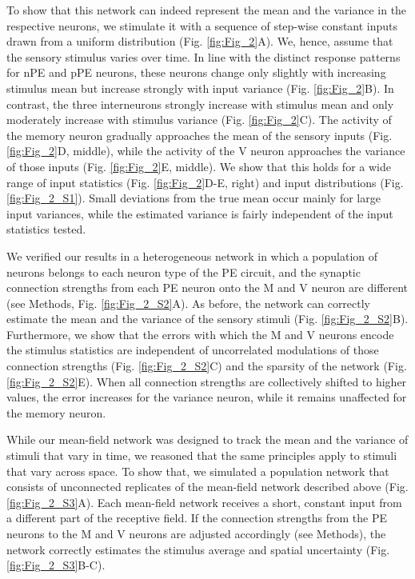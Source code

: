 \documentclass[10pt,a4paper]{article}
\begin{document}
To show that this network can indeed represent the mean and the variance in the respective neurons, we stimulate it with a sequence of step-wise constant inputs drawn from a uniform distribution (Fig. \ref{fig:Fig_2}A). We, hence, assume that the sensory stimulus varies over time. In line with the distinct response patterns for nPE and pPE neurons, these neurons change only slightly with increasing stimulus mean but increase strongly with input variance (Fig. \ref{fig:Fig_2}B). In contrast, the three interneurons strongly increase with stimulus mean and only moderately increase with stimulus variance (Fig. \ref{fig:Fig_2}C). The activity of the memory neuron gradually approaches the mean of the sensory inputs (Fig. \ref{fig:Fig_2}D, middle), while the activity of the V neuron approaches the variance of those inputs (Fig. \ref{fig:Fig_2}E, middle). We show that this holds for a wide range of input statistics (Fig. \ref{fig:Fig_2}D-E, right) and input distributions (Fig. \ref{fig:Fig_2_S1}). Small deviations from the true mean occur mainly for large input variances, while the estimated variance is fairly independent of the input statistics tested. 

We verified our results in a heterogeneous network in which a population of neurons belongs to each neuron type of the PE circuit, and the synaptic connection strengths from each PE neuron onto the M and V neuron are different (see Methods, Fig. \ref{fig:Fig_2_S2}A). As before, the network can correctly estimate the mean and the variance of the sensory stimuli (Fig. \ref{fig:Fig_2_S2}B). Furthermore, we show that the errors with which the M and V neurons encode the stimulus statistics are independent of uncorrelated modulations of those connection strengths (Fig. \ref{fig:Fig_2_S2}C) and the sparsity of the network (Fig. \ref{fig:Fig_2_S2}E). When all connection strengths are collectively shifted to higher values, the error increases for the variance neuron, while it remains unaffected for the memory neuron. 

While our mean-field network was designed to track the mean and the variance of stimuli that vary in time, we reasoned that the same principles apply to stimuli that vary across space. To show that, we simulated a population network that consists of unconnected replicates of the mean-field network described above (Fig. \ref{fig:Fig_2_S3}A). Each mean-field network receives a short, constant input from a different part of the receptive field. If the connection strengths from the PE neurons to the M and V neurons are adjusted accordingly (see Methods), the network correctly estimates the stimulus average and spatial uncertainty (Fig. \ref{fig:Fig_2_S3}B-C).
\end{document}
